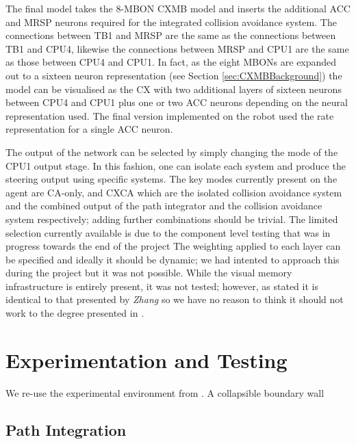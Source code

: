 \documentclass[a4paper,11pt,twoside,openright]{article}
\let\oldsection\section
\def\section{\cleardoublepage\oldsection}
\begin{document}
The final model takes the 8-MBON CXMB model and inserts the additional ACC and
MRSP neurons required for the integrated collision avoidance system. The
connections between TB1 and MRSP are the same as the connections between TB1
and CPU4, likewise the connections between MRSP and CPU1 are the same as those
between CPU4 and CPU1. In fact, as the eight MBONs are expanded out to a
sixteen neuron representation (see Section \ref{sec:CXMBBackground}) the
model can be visualised as the CX with two additional layers of sixteen neurons
between CPU4 and CPU1 plus one or two ACC neurons depending on the neural
representation used. The final version implemented on the robot used the rate
representation for a single ACC neuron.
\newline\par

The output of the network can be selected by simply changing the mode of the
CPU1 output stage. In this fashion, one can isolate each system and produce
the steering output using specific systems. The key modes currently present on
the agent are CA-only, and CXCA which are the isolated collision avoidance system
and the combined output of the path integrator and the collision avoidance
system respectively; adding further combinations should be trivial. The limited
selection currently available is due to the component level testing that
was in progress towards the end of the project The weighting applied to each
layer can be specified and ideally it should be dynamic; we had intented to
approach this during the project but it was not possible. While the visual
memory infrastructure is entirely present, it was not tested; however, as stated
it is identical to that presented by \textit{Zhang} so we have no reason to
think it should not work to the degree presented in \cite{Zhang2017}.

\section{Experimentation and Testing}\label{sec:test}
We re-use the experimental environment from \cite{Mitchell2018}. A collapsible
boundary wall
\subsection{Path Integration}
\end{document}
